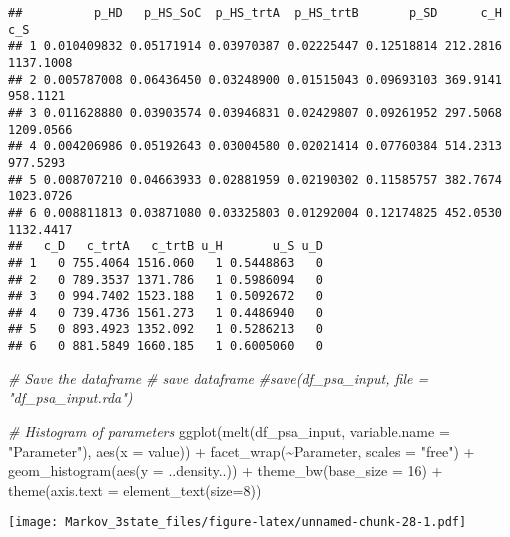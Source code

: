 \documentclass[
]{article}
\newenvironment{Shaded}{\begin{snugshade}}{\end{snugshade}}
\newcommand{\AttributeTok}[1]{\textcolor[rgb]{0.77,0.63,0.00}{#1}}
\newcommand{\CommentTok}[1]{\textcolor[rgb]{0.56,0.35,0.01}{\textit{#1}}}
\newcommand{\DecValTok}[1]{\textcolor[rgb]{0.00,0.00,0.81}{#1}}
\newcommand{\FunctionTok}[1]{\textcolor[rgb]{0.00,0.00,0.00}{#1}}
\newcommand{\NormalTok}[1]{#1}
\newcommand{\SpecialCharTok}[1]{\textcolor[rgb]{0.00,0.00,0.00}{#1}}
\newcommand{\StringTok}[1]{\textcolor[rgb]{0.31,0.60,0.02}{#1}}
\begin{document}
\begin{verbatim}
##          p_HD   p_HS_SoC  p_HS_trtA  p_HS_trtB       p_SD      c_H       c_S
## 1 0.010409832 0.05171914 0.03970387 0.02225447 0.12518814 212.2816 1137.1008
## 2 0.005787008 0.06436450 0.03248900 0.01515043 0.09693103 369.9141  958.1121
## 3 0.011628880 0.03903574 0.03946831 0.02429807 0.09261952 297.5068 1209.0566
## 4 0.004206986 0.05192643 0.03004580 0.02021414 0.07760384 514.2313  977.5293
## 5 0.008707210 0.04663933 0.02881959 0.02190302 0.11585757 382.7674 1023.0726
## 6 0.008811813 0.03871080 0.03325803 0.01292004 0.12174825 452.0530 1132.4417
##   c_D   c_trtA   c_trtB u_H       u_S u_D
## 1   0 755.4064 1516.060   1 0.5448863   0
## 2   0 789.3537 1371.786   1 0.5986094   0
## 3   0 994.7402 1523.188   1 0.5092672   0
## 4   0 739.4736 1561.273   1 0.4486940   0
## 5   0 893.4923 1352.092   1 0.5286213   0
## 6   0 881.5849 1660.185   1 0.6005060   0
\end{verbatim}

\begin{Shaded}
\begin{Highlighting}[]
\CommentTok{\# Save the dataframe}
\CommentTok{\# save dataframe}
\CommentTok{\#save(df\_psa\_input, file = "df\_psa\_input.rda")}


\CommentTok{\# Histogram of parameters}
\FunctionTok{ggplot}\NormalTok{(}\FunctionTok{melt}\NormalTok{(df\_psa\_input, }\AttributeTok{variable.name =} \StringTok{"Parameter"}\NormalTok{), }\FunctionTok{aes}\NormalTok{(}\AttributeTok{x =}\NormalTok{ value)) }\SpecialCharTok{+}
  \FunctionTok{facet\_wrap}\NormalTok{(}\SpecialCharTok{\textasciitilde{}}\NormalTok{Parameter, }\AttributeTok{scales =} \StringTok{"free"}\NormalTok{) }\SpecialCharTok{+}
  \FunctionTok{geom\_histogram}\NormalTok{(}\FunctionTok{aes}\NormalTok{(}\AttributeTok{y =}\NormalTok{ ..density..)) }\SpecialCharTok{+}
  \FunctionTok{theme\_bw}\NormalTok{(}\AttributeTok{base\_size =} \DecValTok{16}\NormalTok{) }\SpecialCharTok{+} 
  \FunctionTok{theme}\NormalTok{(}\AttributeTok{axis.text =} \FunctionTok{element\_text}\NormalTok{(}\AttributeTok{size=}\DecValTok{8}\NormalTok{))}
\end{Highlighting}
\end{Shaded}

\texttt{[image: Markov\_3state\_files/figure-latex/unnamed-chunk-28-1.pdf]}
\end{document}
